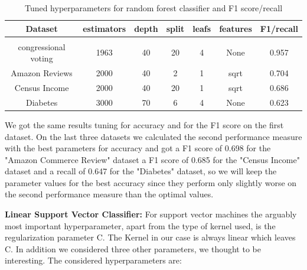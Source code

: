 \documentclass[a4paper,10pt]{article}
\begin{document}
\begin{table}[h!]
    \centering
    \begin{tabular}{|c|c|c|c|c|c|c|}
    \hline
    Dataset & \textsf{estimators} & \textsf{depth} & \textsf{split} & \textsf{leafs} & \textsf{features} & F1/recall \\
    \hline
    \multicolumn{7}{c}{\vspace{-0.4cm}} \\ %
    \hline
    congressional voting & 1963 & 40 & 20 & 4 & None & 0.957 \\%
    \hline
    Amazon Reviews & 2000 & 40 & 2 & 1 & sqrt & 0.704 \\%
    \hline
    Census Income & 2000 & 40 & 20 & 1 & sqrt & 0.686 \\%
    \hline
    Diabetes & 3000 & 70 & 6 & 4 & None & 0.623 \\%
    \hline
    \end{tabular}
    \caption{Tuned hyperparameters for random forest classifier and F1 score/recall} 
    \label{table:tu_hyp_rf_f1}
    \end{table}

We got the same results tuning for accuracy and for the F1 score on the first dataset. On the last three datasets we calculated the second performance measure with the best parameters for accuracy and got a F1 score of 0.698 for the "Amazon Commerce Review" dataset a F1 score of 0.685 for the "Census Income" dataset and a recall of 0.647 for the "Diabetes" dataset, so we will keep the parameter values for the best accuracy since they perform only slightly worse on the second performance measure than the optimal values.

\textbf{Linear Support Vector Classifier:} For support vector machines the arguably most important hyperparameter, apart from the type of kernel used, is the regularization parameter \textsf{C}. The Kernel in our case is always linear which leaves \textsf{C}. In addition we considered three other parameters, we thought to be interesting. The considered hyperparameters are:
\end{document}
